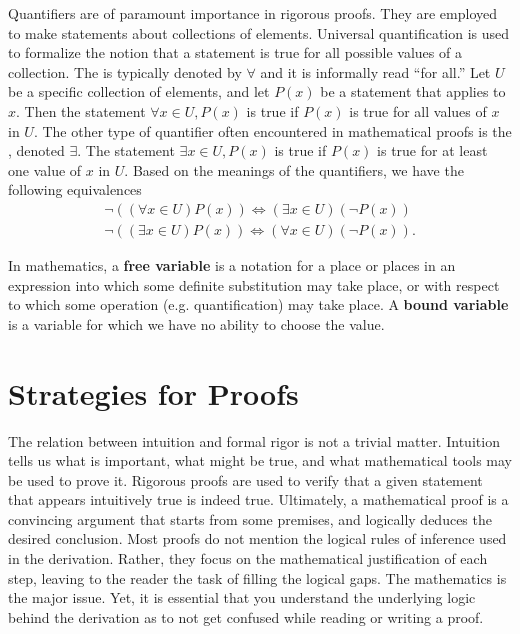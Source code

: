Quantifiers are of paramount importance in rigorous proofs.
They are employed to make statements about collections of elements.
Universal quantification is used to formalize the notion that a statement is true for all possible values of a collection.
The  is typically denoted by $\forall$ and it is informally read ``for all.''
Let $U$ be a specific collection of elements, and let $P(x)$ be a statement that applies to $x$.
Then the statement $\forall x \in U, P(x)$ is true if $P(x)$ is true for all values of $x$ in $U$.
The other type of quantifier often encountered in mathematical proofs is the , denoted $\exists$.
The statement $\exists x \in U, P(x)$ is true if $P(x)$ is true for at least one value of $x$ in $U$.
Based on the meanings of the quantifiers, we have the following equivalences
\begin{gather*}
\neg \left( \left( \forall x \in U \right) P(x) \right)
\Leftrightarrow \left( \exists x \in U \right) \left( \neg P(x) \right) \\
\neg \left( \left( \exists x \in U \right) P(x) \right)
\Leftrightarrow \left( \forall x \in U \right) \left( \neg P(x) \right) .
\end{gather*}

In mathematics, a \textbf{free variable} is a notation for a place or places in an expression into which some definite substitution may take place, or with respect to which some operation (e.g. quantification) may take place. 
A \textbf{bound variable} is a variable for which we have no ability to choose the value.


\section{Strategies for Proofs}

The relation between intuition and formal rigor is not a trivial matter.
Intuition tells us what is important, what might be true, and what mathematical tools may be used to prove it.
Rigorous proofs are used to verify that a given statement that appears intuitively true is indeed true.
Ultimately, a mathematical proof is a convincing argument that starts from some premises, and logically deduces the desired conclusion.
Most proofs do not mention the logical rules of inference used in the derivation.
Rather, they focus on the mathematical justification of each step, leaving to the reader the task of filling the logical gaps.
The mathematics is the major issue.
Yet, it is essential that you understand the underlying logic behind the derivation as to not get confused while reading or writing a proof.

